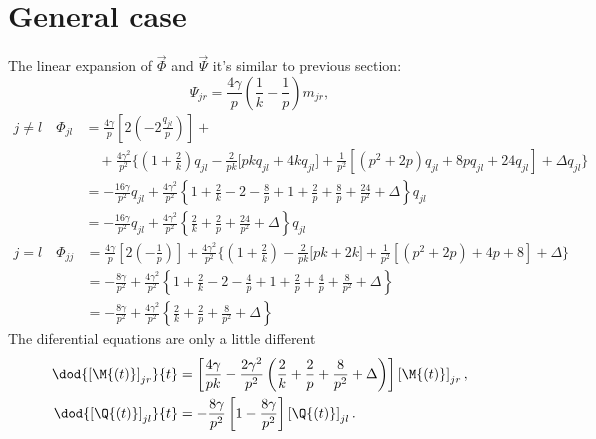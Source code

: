 \section{General case}
The linear expansion of \(\vec{\Phi}\) and \(\vec{\Psi}\) it's similar to previous section:
\[
  \Psi_{jr} = \frac{4 \gamma}{p} \left(\frac1k - \frac{1}{p}\right) m_{jr},
\]\[
  \begin{split}
    j \neq l \quad \Phi_{jl} &= \frac{4 \gamma}{p}\left[
        2\left( - 2\frac{q_{jl}}{p}\right)
    \right] +\\
    &\quad+\frac{4 \gamma^2}{p^2} \Biggr\{
          \left(1+\frac2k\right)q_{jl} -\frac2{pk}\Biggl[pk q_{jl} + 4 k q_{jl} \Biggl] + 
          \frac1{p^2}\left[\left(p^2+2p\right)q_{jl} +
          8p q_{jl} + 24q_{jl} \right] + \Delta q_{jl}\Biggr\} \\ 
    &= -\frac{16 \gamma}{p^2} q_{jl} 
      +\frac{4 \gamma^2}{p^2} \left\{
        1+\frac2k -2 -\frac{8}{p} +1 +\frac2p +\frac8p + \frac{24}{p^2} + \Delta \right\}q_{jl} \\
    &= -\frac{16 \gamma}{p^2} q_{jl} 
    +\frac{4 \gamma^2}{p^2} \left\{\frac2k +\frac{2}{p} + \frac{24}{p^2} + \Delta \right\}q_{jl}
  \end{split}
\]\[
  \begin{split}
    j = l \quad \Phi_{jj} &= \frac{4 \gamma}{p}\left[
        2\left( -\frac{1}{p}\right)
    \right] + \frac{4 \gamma^2}{p^2} \Biggr\{
          \left(1+\frac2k\right) -\frac2{pk}\Biggl[pk + 2k \Biggl] + 
          \frac1{p^2}\left[\left(p^2+2p\right) +
          4p + 8 \right] + \Delta\Biggr\} \\
    &= -\frac{8 \gamma}{p^2} + \frac{4 \gamma^2}{p^2} \left\{
      1+\frac2k -2 -\frac{4}{p} +1 +\frac2p +\frac4p + \frac{8}{p^2} + \Delta \right\} \\
    &= -\frac{8 \gamma}{p^2} +\frac{4 \gamma^2}{p^2} \left\{\frac2k +\frac{2}{p} + \frac{8}{p^2} + \Delta \right\}
  \end{split}
\]
The diferential equations are only a little different
\begin{equation}\begin{split}
  \dod{\left[\M{\left(t\right)}\right]_{jr}}{t}
    &= \left[
      \frac{4 \gamma}{pk} -\frac{2 \gamma^2}{p^2} \left(\frac2k +\frac{2}{p} + \frac{8}{p^2} + \Delta \right)
    \right] \left[\M{\left(t\right)}\right]_{jr},\\
  \dod{\left[\Q{\left(t\right)}\right]_{jl}}{t} &= -\frac{8 \gamma}{p^2} \left[1-\frac{8\gamma}{p^2}\right] \left[\Q{\left(t\right)}\right]_{jl}.
\end{split}\end{equation}